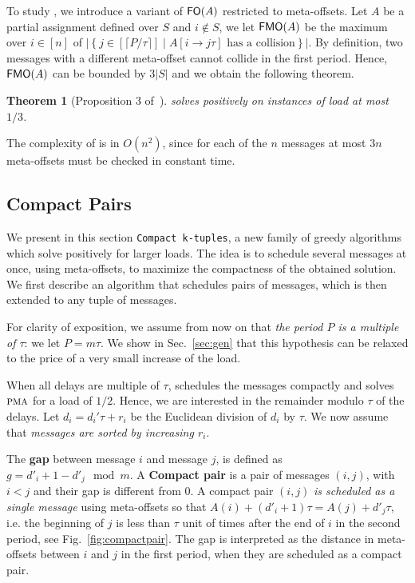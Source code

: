 \documentclass[pdflatex,sn-mathphys,iicol]{sn-jnl}%
\theoremstyle{thmstyleone}%
\newtheorem{theorem}{Theorem}%
\theoremstyle{thmstyletwo}%
\theoremstyle{thmstylethree}%
\begin{document}
To study \metaoffset, we introduce a variant of $\textsf{FO}(A)$ restricted to meta-offsets.
 Let $A$ be a partial assignment defined over $S$ and $i\notin S$, we let $\textsf{FMO}(A)$ be the maximum over $i \in [n]$ of $\lvert\left\{ j \in [\lceil P / \tau \rceil] \mid A[i \rightarrow j\tau] \text{ has a collision}\right\}\rvert$.
 By definition, two messages with a different meta-offset cannot collide in the first period. Hence, $\textsf{FMO}(A)$ can be bounded by $3\lvert S\rvert$ and we obtain the following theorem.


\begin{theorem}[Proposition 3 of~\cite{bartharxiv2018deterministic}]\label{th:metaoffset}
\metaoffset solves \pma positively on instances of load at most $1/3$.
\end{theorem}

The complexity of \metaoffset is in $O(n^2)$, since for each of the $n$ messages at most $3n$ meta-offsets must be checked in constant time. 

\subsection{Compact Pairs}

We present in this section \texttt{Compact k-tuples}, a new family of greedy algorithms which solve \pma positively for larger loads. The idea is to schedule several messages at once, using meta-offsets, to maximize the compactness of the obtained solution. We first describe an algorithm that schedules pairs of messages, which is then extended to any tuple of messages. 

For clarity of exposition, we assume from now on that \emph{the period $P$ is a multiple of $\tau$}: we let $P = m\tau$. We show in Sec.~\ref{sec:gen} that this hypothesis can be relaxed to the price of a very small increase of the load. 

When all delays are multiple of $\tau$, \metaoffset schedules the messages compactly and solves $\textsc{pma}$ for a load of $1/2$. Hence, we are interested in the remainder modulo $\tau$ of the delays. Let $d_i = d_{i}'\tau + r_i$ be the Euclidean division of $d_i$ by $\tau$. We now assume that \emph{messages are sorted by increasing $r_i$}.

The \textbf{gap} between message $i$ and message $j$, is defined as $g = d'_{i} + 1 - d'_{j} \mod m$.
A \textbf{Compact pair} is a pair of messages $(i,j)$, with $i < j$ and their gap is different from $0$. A compact pair $(i,j)$ \emph{is scheduled as a single message} using meta-offsets so that $A(i) + (d'_i+1)\tau = A(j) + d'_j\tau$, i.e. the beginning of $j$ is less than $\tau$ unit of times after the end of $i$ in the second period, see Fig.~\ref{fig:compactpair}. The gap is interpreted as the distance in meta-offsets between $i$ and $j$ in the first period, when they are scheduled as a compact pair.
\end{document}
